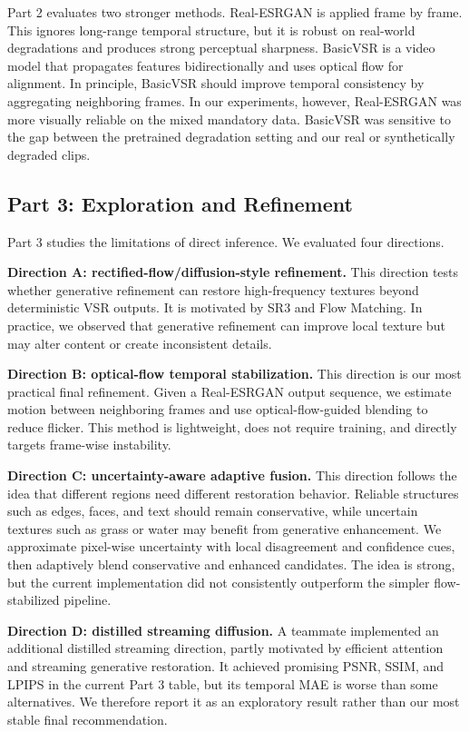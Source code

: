 \documentclass[10pt,twocolumn,letterpaper]{article}
\begin{document}
Part 2 evaluates two stronger methods. Real-ESRGAN is applied frame by frame. This ignores long-range temporal structure, but it is robust on real-world degradations and produces strong perceptual sharpness. BasicVSR is a video model that propagates features bidirectionally and uses optical flow for alignment. In principle, BasicVSR should improve temporal consistency by aggregating neighboring frames. In our experiments, however, Real-ESRGAN was more visually reliable on the mixed mandatory data. BasicVSR was sensitive to the gap between the pretrained degradation setting and our real or synthetically degraded clips.

\subsection{Part 3: Exploration and Refinement}

Part 3 studies the limitations of direct inference. We evaluated four directions.

\noindent\textbf{Direction A: rectified-flow/diffusion-style refinement.}
This direction tests whether generative refinement can restore high-frequency textures beyond deterministic VSR outputs. It is motivated by SR3 and Flow Matching. In practice, we observed that generative refinement can improve local texture but may alter content or create inconsistent details.

\noindent\textbf{Direction B: optical-flow temporal stabilization.}
This direction is our most practical final refinement. Given a Real-ESRGAN output sequence, we estimate motion between neighboring frames and use optical-flow-guided blending to reduce flicker. This method is lightweight, does not require training, and directly targets frame-wise instability.

\noindent\textbf{Direction C: uncertainty-aware adaptive fusion.}
This direction follows the idea that different regions need different restoration behavior. Reliable structures such as edges, faces, and text should remain conservative, while uncertain textures such as grass or water may benefit from generative enhancement. We approximate pixel-wise uncertainty with local disagreement and confidence cues, then adaptively blend conservative and enhanced candidates. The idea is strong, but the current implementation did not consistently outperform the simpler flow-stabilized pipeline.

\noindent\textbf{Direction D: distilled streaming diffusion.}
A teammate implemented an additional distilled streaming direction, partly motivated by efficient attention and streaming generative restoration. It achieved promising PSNR, SSIM, and LPIPS in the current Part 3 table, but its temporal MAE is worse than some alternatives. We therefore report it as an exploratory result rather than our most stable final recommendation.
\end{document}
